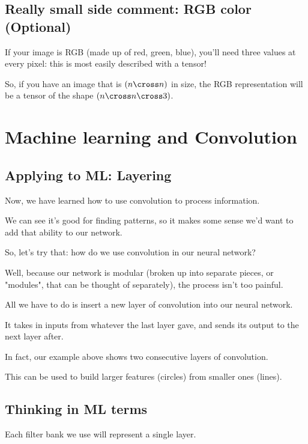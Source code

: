     \subsection{Really small side comment: RGB color (Optional)}
    
        If your image is RGB (made up of red, green, blue), you'll need three values at every pixel: this is most easily described with a tensor!
        
        So, if you have an image that is $(n \cross n)$ in size, the RGB representation will be a tensor of the shape $(n \cross n \cross 3)$.
    
\section{Machine learning and Convolution}

    \subsection{Applying to ML: Layering}
    
        Now, we have learned how to use convolution to process information. 
        
        We can see it's good for finding patterns, so it makes some sense we'd want to add that ability to our network.
        
        So, let's try that: how do we use convolution in our neural network?
        
        Well, because our network is modular (broken up into separate pieces, or "modules", that can be thought of separately), the process isn't too painful.
        
        All we have to do is insert a new layer of convolution into our neural network. 
        
        It takes in inputs from whatever the last layer gave, and sends its output to the next layer after. 
        
        In fact, our example above shows two consecutive layers of convolution.
        
        This can be used to build larger features (circles) from smaller ones (lines).
        
    \subsection{Thinking in ML terms}
        
        Each filter bank we use will represent a single layer.
        
